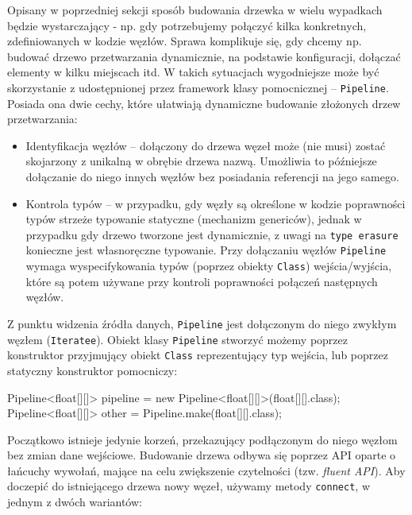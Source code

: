 Opisany w poprzedniej sekcji sposób budowania drzewka w wielu wypadkach będzie wystarczający - np.
gdy potrzebujemy połączyć kilka konkretnych, zdefiniowanych w kodzie węzłów. Sprawa komplikuje się,
gdy chcemy np. budować drzewo przetwarzania dynamicznie, na podstawie konfiguracji, dołączać
elementy w kilku miejscach itd. W takich sytuacjach wygodniejsze może być skorzystanie z
udostępnionej przez framework klasy pomocnicznej -- \texttt{Pipeline}. Posiada ona dwie cechy, które
ułatwiają dynamiczne budowanie złożonych drzew przetwarzania:

\begin{itemize}
  \item{Identyfikacja węzłów} -- dołączony do drzewa węzeł może (nie musi) zostać skojarzony z
    unikalną w obrębie drzewa nazwą. Umożliwia to późniejsze dołączanie do niego innych węzłów bez
    posiadania referencji na jego samego.

  \item{Kontrola typów} -- w przypadku, gdy węzły są określone w kodzie poprawności typów strzeże
    typowanie statyczne (mechanizm genericów), jednak w przypadku gdy drzewo tworzone jest
    dynamicznie, z uwagi na \texttt{type erasure} konieczne jest własnoręczne typowanie. Przy
    dołączaniu węzłów \texttt{Pipeline} wymaga wyspecifykowania typów (poprzez obiekty
    \texttt{Class}) wejścia/wyjścia, które są potem używane przy kontroli poprawności połączeń
    następnych węzłów.

\end{itemize}

Z punktu widzenia źródła danych, \texttt{Pipeline} jest dołączonym do niego zwykłym węzłem
(\texttt{Iteratee}).  Obiekt klasy \texttt{Pipeline} stworzyć możemy poprzez konstruktor przyjmujący
obiekt \texttt{Class} reprezentujący typ wejścia, lub poprzez statyczny konstruktor pomocniczy:

\begin{java}
Pipeline<float[][]> pipeline = new Pipeline<float[][]>(float[][].class);
Pipeline<float[][]> other = Pipeline.make(float[][].class);
\end{java}

Początkowo istnieje jedynie korzeń, przekazujący podłączonym do niego węzłom bez zmian dane
wejściowe. Budowanie drzewa odbywa się poprzez API oparte o łańcuchy wywołań, mające na celu
zwiększenie czytelności (tzw. \emph{fluent API}). Aby doczepić do istniejącego drzewa nowy węzeł,
używamy metody \texttt{connect}, w jednym z dwóch wariantów:

